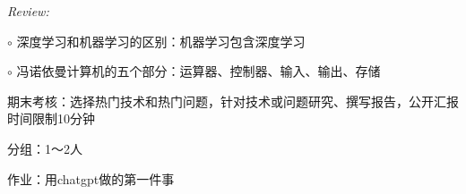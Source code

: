 \textit{Review:}

$\circ$ 深度学习和机器学习的区别：机器学习包含深度学习

$\circ$ 冯诺依曼计算机的五个部分：运算器、控制器、输入、输出、存储

\begin{notation}
    期末考核：选择热门技术和热门问题，针对技术或问题研究、撰写报告，公开汇报时间限制10分钟

    分组：1～2人
\end{notation}
\begin{notation}
作业：用chatgpt做的第一件事
\end{notation}
